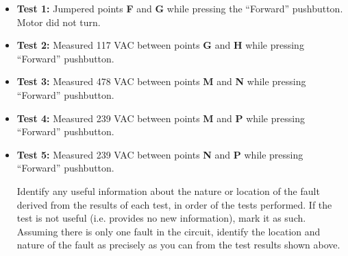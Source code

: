 \begin{itemize}
\item{} {\bf Test 1:} Jumpered points {\bf F} and {\bf G} while pressing the ``Forward'' pushbutton.  Motor did not turn.
\vskip 20pt
\item{} {\bf Test 2:} Measured 117 VAC between points {\bf G} and {\bf H} while pressing ``Forward'' pushbutton.
\vskip 20pt
\item{} {\bf Test 3:} Measured 478 VAC between points {\bf M} and {\bf N} while pressing ``Forward'' pushbutton.
\vskip 20pt
\item{} {\bf Test 4:} Measured 239 VAC between points {\bf M} and {\bf P} while pressing ``Forward'' pushbutton.
\vskip 20pt
\item{} {\bf Test 5:} Measured 239 VAC between points {\bf N} and {\bf P} while pressing ``Forward'' pushbutton.
\vskip 20pt
\medskip

Identify any useful information about the nature or location of the fault derived from the results of each test, in order of the tests performed.  If the test is not useful (i.e. provides no new information), mark it as such.  Assuming there is only one fault in the circuit, identify the location and nature of the fault as precisely as you can from the test results shown above.








\end{itemize}

